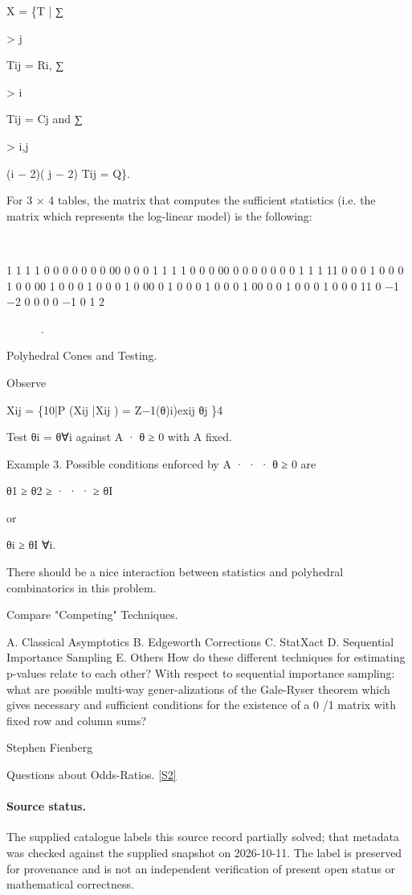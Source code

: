 \documentclass[11pt]{article}
\newcommand{\sref}[2]{\hyperlink{source:#1:#2}{[S#2]}}
\begin{document}
X = \{T | ∑

> j

Tij = Ri, ∑

> i

Tij = Cj and ∑

> i,j

(i − 2)( j − 2) Tij = Q\}.

For 3 × 4 tables, the matrix that computes the sufficient statistics (i.e. the matrix which represents the log-linear model) is the following:



1 1 1 1 0 0 0 0 0 0 0 00 0 0 0 1 1 1 1 0 0 0 00 0 0 0 0 0 0 0 1 1 1 11 0 0 0 1 0 0 0 1 0 0 00 1 0 0 0 1 0 0 0 1 0 00 0 1 0 0 0 1 0 0 0 1 00 0 0 1 0 0 0 1 0 0 0 11 0 −1 −2 0 0 0 0 −1 0 1 2

.

Polyhedral Cones and Testing.

Observe

Xij = \{10|P (Xij |Xij ) = Z−1(θ)i)exij θj \}4

Test θi = θ∀i against A · θ ≥ 0 with A fixed.

Example 3. Possible conditions enforced by A · · · θ ≥ 0 are

θ1 ≥ θ2 ≥ · · · ≥ θI

or

θi ≥ θI ∀i.

There should be a nice interaction between statistics and polyhedral combinatorics in this problem.

Compare "Competing" Techniques.

A. Classical Asymptotics B. Edgeworth Corrections C. StatXact D. Sequential Importance Sampling E. Others How do these different techniques for estimating p-values relate to each other? With respect to sequential importance sampling: what are possible multi-way gener-alizations of the Gale-Ryser theorem which gives necessary and sufficient conditions for the existence of a 0 /1 matrix with fixed row and column sums?

Stephen Fienberg

Questions about Odds-Ratios. \sref{statement}{2}
\paragraph{Source status.}
The supplied catalogue labels this source record partially solved; that metadata was checked against the supplied snapshot on 2026-10-11. The label is preserved for provenance and is not an independent verification of present open status or mathematical correctness.
\end{document}
